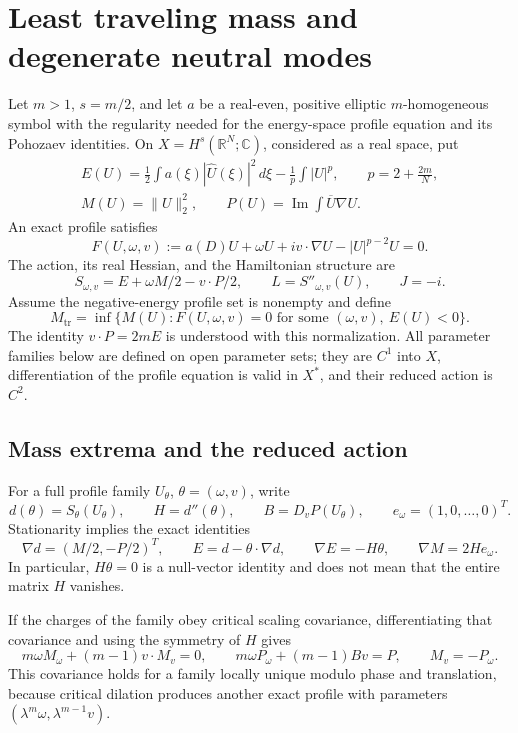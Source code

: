 \section{Least traveling mass and degenerate neutral modes}
\label{sec:r11-endpoint}

Let $m>1$, $s=m/2$, and let $a$ be a real-even, positive elliptic
$m$-homogeneous symbol with the regularity needed for the energy-space
profile equation and its Pohozaev identities.  On
$X=H^s(\mathbb R^N;\mathbb C)$, considered as a real space, put
\begin{gather*}
 E(U)=\frac12\int a(\xi)|\widehat U(\xi)|^2\,d\xi
       -\frac1p\int|U|^p,\qquad p=2+\frac{2m}{N},\\
 M(U)=\|U\|_2^2,\qquad
 P(U)=\operatorname{Im}\int\overline U\nabla U.
\end{gather*}
An exact profile satisfies
\begin{equation}\label{eq:r11-end-profile}
 F(U,\omega,v):=a(D)U+\omega U+iv\cdot\nabla U-|U|^{p-2}U=0.
\end{equation}
The action, its real Hessian, and the Hamiltonian structure are
\[
 S_{\omega,v}=E+\omega M/2-v\cdot P/2,
 \qquad L=S''_{\omega,v}(U),\qquad J=-i.
\]
Assume the negative-energy profile set is nonempty and define
\[
 M_{\mathrm{tr}}=\inf\{M(U):F(U,\omega,v)=0
                  \text{ for some }(\omega,v),\ E(U)<0\}.
\]
The identity $v\cdot P=2mE$ is understood with this normalization.
All parameter families below are defined on open parameter sets; they
are $C^1$ into $X$, differentiation of the profile equation is valid in
$X^*$, and their reduced action is $C^2$.

\subsection{Mass extrema and the reduced action}

For a full profile family $U_\theta$, $\theta=(\omega,v)$, write
\[
 d(\theta)=S_\theta(U_\theta),\qquad H=d''(\theta),
 \qquad B=D_vP(U_\theta),\qquad e_\omega=(1,0,\ldots,0)^T.
\]
Stationarity implies the exact identities
\begin{equation}\label{eq:r11-end-legendre}
 \nabla d=(M/2,-P/2)^T,\qquad
 E=d-\theta\cdot\nabla d,\qquad
 \nabla E=-H\theta,\qquad \nabla M=2He_\omega.
\end{equation}
In particular, $H\theta=0$ is a null-vector identity and does not
mean that the entire matrix $H$ vanishes.

If the charges of the family obey critical scaling covariance,
differentiating that covariance and using the symmetry of $H$ gives
\begin{equation}\label{eq:r11-end-scaling}
 m\omega M_\omega+(m-1)v\cdot M_v=0,\qquad
 m\omega P_\omega+(m-1)Bv=P,\qquad M_v=-P_\omega.
\end{equation}
This covariance holds for a family locally unique modulo phase and
translation, because critical dilation produces another exact profile
with parameters $(\lambda^m\omega,\lambda^{m-1}v)$.

